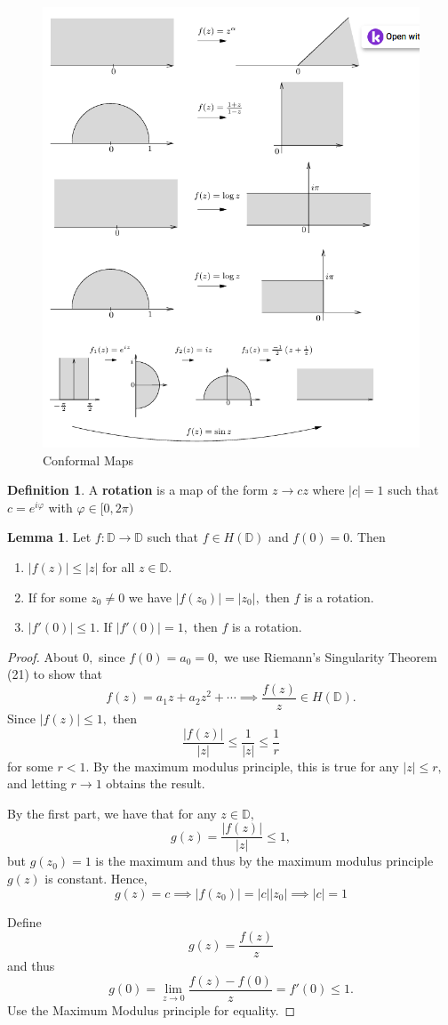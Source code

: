 \documentclass[10pt, oneside]{article}
\theoremstyle{definition}
\newtheorem{defn}{Definition}
\newtheorem{lem}{Lemma}
\begin{document}
\begin{figure}[H]
    \centering
    \includegraphics[width=0.5\linewidth]{Images/ComformalMaps.png}
    \caption{Conformal Maps}
\end{figure}

\begin{defn}
    A \textbf{rotation} is a map of the form $z\to cz$ where $|c| = 1$ such that $c = e^{i\varphi}$ with $\varphi \in  [0,2\pi)$
\end{defn}

\begin{lem}
    Let $f: \mathbb{D}\to \mathbb{D}$ such that $f \in H(\mathbb{D})$ and $f(0) = 0.$ Then 
    \begin{enumerate}
        \item $|f(z)| \leq |z|$ for all $z \in \mathbb{D}.$
        \item If for some $z_0 \neq 0$ we have $|f(z_0)| = |z_0|,$ then $f$ is a rotation.
        \item $|f'(0)| \leq 1.$ If $|f'(0)| = 1,$ then $f$ is a rotation.
    \end{enumerate}
\end{lem}
\begin{proof}
    About $0,$ since $f(0) = a_0 = 0,$ we use Riemann's Singularity Theorem (21) to show that 
    \[f(z) = a_1 z + a_2z^2 + \cdots \implies \frac{f(z)}{z} \in H(\mathbb{D}).\] Since $|f(z)| \leq 1,$ then 
    \[\frac{|f(z)|}{|z|}  \leq \frac{1}{|z|}\leq \frac{1}{r}\] for some $r<1.$ By the maximum modulus principle, this is true for any $|z| \leq r,$ and letting $r\to 1$ obtains the result. 

    By the first part, we have that for any $z\in \mathbb{D},$
    \[g(z) =\frac{|f(z)|}{|z|} \leq 1,\] but $g(z_0) = 1$ is the maximum and thus by the maximum modulus principle $g(z)$ is constant. Hence, 
    \[g(z)= c \implies |f(z_0)| = |c||z_0| \implies |c| = 1\]

    Define 
    \[g(z) = \frac{f(z)}{z}\] and thus 
    \[g(0) = \lim_{z\to 0}\frac{f(z) - f(0)}{z} = f'(0) \leq 1.\] Use the Maximum Modulus principle for equality.
\end{proof}
\end{document}
